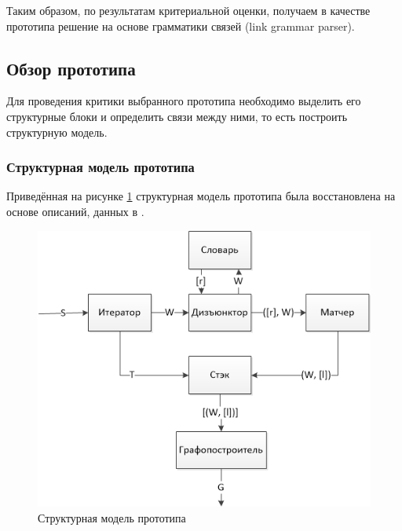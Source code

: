 Таким образом, по результатам критериальной оценки, получаем в качестве прототипа решение на основе грамматики связей (link grammar parser).

\subsection{Обзор прототипа}
Для проведения критики выбранного прототипа необходимо выделить его структурные блоки и определить связи между ними, то есть построить структурную модель.

\subsubsection{Структурная модель прототипа}
Приведённая на рисунке \ref{fig:prototype_struct} структурная модель прототипа была восстановлена на основе описаний, данных в \cite{sleator}.

\begin{figure}[H]
	\centering
		\includegraphics[scale=1.0]{images/initialstructure.png}
	\caption{\small Структурная модель прототипа}
	\label{fig:prototype_struct}
\end{figure}

